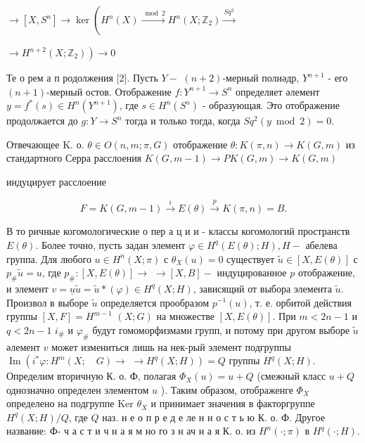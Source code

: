 \documentclass[10pt]{article}
\begin{document}
$\longrightarrow\left[X, S^{n}\right] \longrightarrow \operatorname{ker}\left(H^{n}(X) \stackrel{\bmod 2}{\longrightarrow} H^{n}\left(X ; \mathbb{Z}_{2}\right) \stackrel{S q^{2}}{\longrightarrow}\right.$



$\left.\longrightarrow H^{n+2}\left(X ; \mathbb{Z}_{2}\right)\right) \longrightarrow 0$



Те о рем а п родолжения [2]. Пусть $Y-$ $(n+2)$-мерный полиәдр, $Y^{n+1}$ - его $(n+1)$-мерный остов. Отображение $f: Y^{n+1} \rightarrow S^{n}$ определяет әлемент $y=f^{*}(s) \in H^{n}\left(Y^{n+1}\right)$, где $s \in H^{n}\left(S^{n}\right)$ - образующая. Это отображение продолжается до $g: Y \rightarrow S^{n}$ тогда и только тогда, когда $S q^{2}(y \bmod 2)=0$.



Отвечающее K. о. $\theta \in O(n, m ; \pi, G)$ отображение $\theta: K(\pi, n) \rightarrow K(G, m)$ из стандартного Серра расслоения $K(G, m-1) \longrightarrow P K(G, m) \rightarrow K(G, m)$



индуцирует расслоение



\[

F=K(G, m-1) \stackrel{i}{\longrightarrow} E(\theta) \stackrel{p}{\longrightarrow} K(\pi, n)=B .

\]



В то ричные когомологические о пер а ц и и - классы когомологий пространств $E(\theta)$. Более точно, пусть задан элемент $\varphi \in H^{q}(E(\theta) ; H), H-$ абелева группа. Для любого $u \in H^{n}(X ; \pi)$ с $\theta_{X}(u)=0$ существует $\tilde{u} \in[X, E(\theta)]$ с $p_{\#} \tilde{u}=u$, где $p_{\#}:[X, E(\theta)] \rightarrow$ $\rightarrow[X, B]-$ индуцированное $p$ отображение, и элемент $v=\underline{u} \tilde{u}=\tilde{u} *(\varphi) \in H^{q}(X ; H)$, зависящий от выбора элемента $\tilde{u}$. Произвол в выборе $\tilde{u}$ определяется прообразом $p^{-1}(u)$, т. е. орбитой действия группы $[X, F]=H^{m-1}$ $(X ; G)$ на множестве $[X, E(\theta)]$. При $m<2 n-1$ и $q<2 n-1$ $i_{\#}$ и $\varphi_{\#}$ будут гомоморфизмами групп, и потому при другом выборе $\tilde{u}$ әлемент $v$ может измениться лишь на нек-рый элемент подгруппы $\operatorname{Im}\left(i^{*} \varphi: H^{m}(X ; \quad G) \rightarrow\right.$ $\left.\rightarrow H^{q}(X ; H)\right)=Q$ группы $H^{q}(X ; H)$. Определим вторичную К. о. Ф, полагая $\Phi_{X}(u)=u+Q$ (смежный класс $u+Q$ однозначно определен элементом $u$ ). Таким образом, отображенге $\Phi_{X}$ определено на подгруппе Ker $\theta_{X}$ и принимает значения в факторгруппе $H^{q}(X ; H) / Q$, где $Q$ наз. н е о п р е д е ле н н о с т ь ю К. о. Ф. Другое название: Ф- ч а с т и ч н а я м но го з н ач н а я К. о. из $H^{n}(\cdot ; \pi)$ в $H^{q}(\cdot ; H)$.
\end{document}
